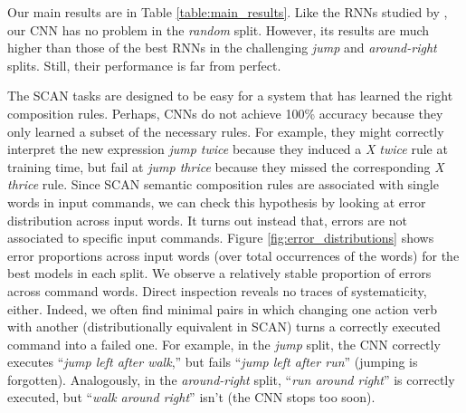 \begin{table}[tb]
  \begin{footnotesize}
    \begin{center}
    \end{center}
  \end{footnotesize}
  \caption{Test accuracy (\%) on SCAN splits (means across 5 seeds,
    with standard deviation if available). Top LSTM results from
    /, GRU from
      .}
\label{table:main_results} 
\end{table}

Our main results are in Table \ref{table:main_results}. Like the
RNNs studied by , our CNN has no problem in
the \emph{random} split. However, its results are much higher than
those of the best RNNs in the challenging \emph{jump} and
\emph{around-right} splits. Still, their performance is far from perfect.

The SCAN tasks are designed to be easy for a system that has learned
the right composition rules. Perhaps, CNNs do not achieve 100\%
accuracy because they only learned a subset of the necessary
rules. For example, they might correctly interpret the new
expression \emph{jump twice} because they induced a \emph{X twice}
rule at training time, but fail at \emph{jump
  thrice} because they missed the corresponding \emph{X
  thrice} rule. Since SCAN semantic composition rules are associated
with single words in input commands, we can check this hypothesis by
looking at error distribution across input words. It turns out instead that,
errors are not associated to specific input commands.  Figure
\ref{fig:error_distributions} shows error proportions across input
words (over total occurrences of the words) for the best models in
each split. We observe a relatively stable proportion of errors across
command words. Direct inspection reveals no traces of
systematicity, either. Indeed, we often find minimal pairs in which changing
one action verb with another (distributionally equivalent in SCAN)
turns a correctly executed command into a failed one. For
example, in the \emph{jump} split, the CNN correctly executes
``\emph{jump left after walk},'' but fails ``\emph{jump left after
  run}'' (jumping is forgotten). Analogously, in the
\emph{around-right} split, ``\emph{run around right}'' is correctly
executed, but ``\emph{walk around right}'' isn't (the CNN stops too
soon).

